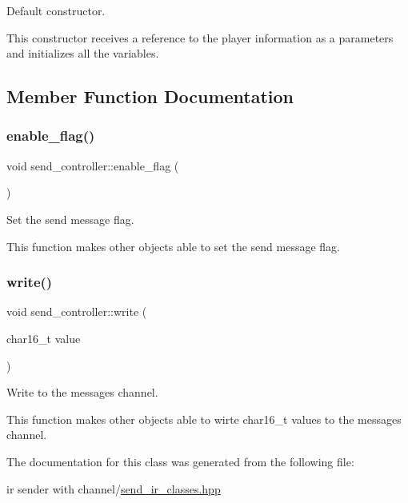 Default constructor. 

This constructor receives a reference to the player information as a parameters and initializes all the variables. 

\subsection{Member Function Documentation}
\hypertarget{classsend__controller_a29cfa70656efe2e26bc2c7cebe84ee46}{}\label{classsend__controller_a29cfa70656efe2e26bc2c7cebe84ee46} 
\subsubsection{\texorpdfstring{enable\+\_\+flag()}{enable\_flag()}}
{\footnotesize\ttfamily void send\+\_\+controller\+::enable\+\_\+flag (\begin{DoxyParamCaption}{ }\end{DoxyParamCaption})\hspace{0.3cm}{\ttfamily [inline]}}



Set the send message flag. 

This function makes other objects able to set the send message flag. \hypertarget{classsend__controller_ada7d206636bf7b867696cfa8fdd080b2}{}\label{classsend__controller_ada7d206636bf7b867696cfa8fdd080b2} 
\subsubsection{\texorpdfstring{write()}{write()}}
{\footnotesize\ttfamily void send\+\_\+controller\+::write (\begin{DoxyParamCaption}\item[{char16\+\_\+t}]{value }\end{DoxyParamCaption})\hspace{0.3cm}{\ttfamily [inline]}}



Write to the messages channel. 

This function makes other objects able to wirte char16\+\_\+t values to the messages channel. 

The documentation for this class was generated from the following file\+:\begin{DoxyCompactItemize}
\item 
ir sender with channel/\hyperlink{ir_01sender_01with_01channel_2send__ir__classes_8hpp}{send\+\_\+ir\+\_\+classes.\+hpp}\end{DoxyCompactItemize}
